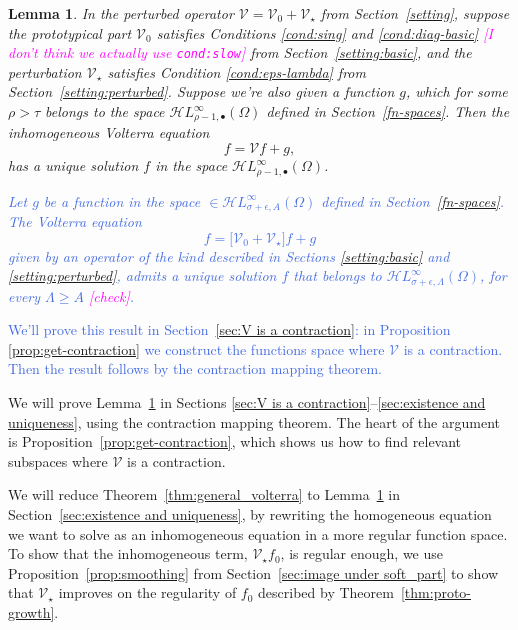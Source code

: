 \documentclass{article}
\theoremstyle{plain}
\newtheorem{lemma}{Lemma}
\newcommand{\singexp}[2]{\mathcal{H}L^\infty_{#1, #2}}
\newcommand{\singexpalg}[1]{\singexp{#1}{\bullet}}
\newcommand{\volterra}{\mathcal{V}}
\newcommand{\hardpart}{\mathcal{V}_0}
\newcommand{\softpart}{\mathcal{V}_\star}
\begin{document}
\begin{lemma}\label{lem:perturbed_volterra}
In the perturbed operator $\volterra = \hardpart +\softpart$ from Section~\ref{setting}, suppose the prototypical part $\hardpart$ satisfies {\em Conditions \eqref{cond:sing}} and \eqref{cond:diag-basic} \textcolor{magenta}{[I don't think we actually use \texttt{cond:slow}]} from Section~\ref{setting:basic}, and the perturbation $\softpart$ satisfies {\em Condition \eqref{cond:eps-lambda}} from Section~\ref{setting:perturbed}. Suppose we're also given a function $g$, which for some $\rho > \tau$ belongs to the space $\singexpalg{\rho-1}(\Omega)$ defined in Section~\ref{fn-spaces}. Then the inhomogeneous Volterra equation
\[ f = \volterra f + g, \]
has a unique solution $f$ in the space $\singexpalg{\rho-1}(\Omega)$.

\textcolor{RoyalBlue}{Let $g$ be a function in the space $\in\singexp{\sigma+\epsilon}{A}(\Omega)$ defined in Section~\ref{fn-spaces}. The Volterra equation
\[ f = \Big[\hardpart +\softpart \Big] f + g \]
given by an operator of the kind described in Sections \ref{setting:basic} and \ref{setting:perturbed}, admits a unique solution $f$ that belongs to $\singexp{\sigma+\epsilon}{\Lambda}(\Omega)$, for every $\Lambda\geq A$ \textcolor{magenta}{[check]}.}
\end{lemma}
\textcolor{RoyalBlue}{We'll prove this result in Section~\ref{sec:V is a contraction}: in Proposition \ref{prop:get-contraction} we construct the functions space where $\volterra$ is a contraction. Then the result follows by the contraction mapping theorem.}\par
We will prove Lemma~\ref{lem:perturbed_volterra} in Sections \ref{sec:V is a contraction}--\ref{sec:existence and uniqueness}, using the contraction mapping theorem. The heart of the argument is Proposition~\ref{prop:get-contraction}, which shows us how to find relevant subspaces where $\volterra$ is a contraction.

We will reduce Theorem~\ref{thm:general_volterra} to Lemma~\ref{lem:perturbed_volterra} in Section~\ref{sec:existence and uniqueness}, by rewriting the homogeneous equation we want to solve as an inhomogeneous equation in a more regular function space. To show that the inhomogeneous term, $\softpart f_0$, is regular enough, we use Proposition~\ref{prop:smoothing} from Section~\ref{sec:image under soft_part} to show that $\softpart$ improves on the regularity of $f_0$ described by Theorem~\ref{thm:proto-growth}.

\end{document}
